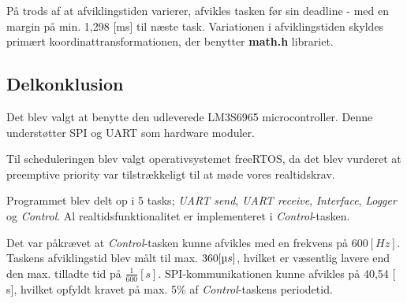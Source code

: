 
På trods af at afviklingstiden varierer, afvikles tasken før sin deadline - med en margin på min. 1,298 [ms] til næste task. 
Variationen i afviklingstiden skyldes primært koordinattransformationen, der benytter \textbf{math.h} librariet. 

\subsection{Delkonklusion}
Det blev valgt at benytte den udleverede LM3S6965 microcontroller. Denne understøtter SPI og UART som hardware moduler. 

Til scheduleringen blev valgt operativsystemet freeRTOS, da det blev vurderet at preemptive priority var tilstrækkeligt til at møde vores realtidskrav. 

Programmet blev delt op i 5 tasks; \textit{UART send}, \textit{UART receive}, \textit{Interface}, \textit{Logger} og \textit{Control}. 
Al realtidsfunktionalitet er implementeret i \textit{Control}-tasken. 

Det var påkrævet at \textit{Control}-tasken kunne afvikles med en frekvens på $600 [Hz]$. 
Taskens afviklingstid blev målt til max. $360 [\micro s]$, hvilket er væsentlig lavere end den max. tilladte tid på $\frac{1}{600}  [s]$. 
SPI-kommunikationen kunne afvikles på 40,54 [ \micro s], hvilket opfyldt kravet på max. 5\% af \textit{Control}-taskens periodetid. 



